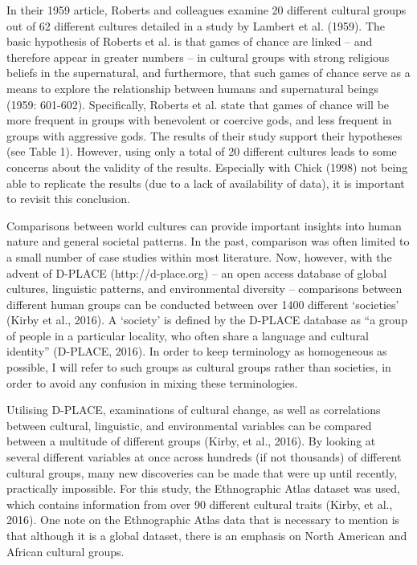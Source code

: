 \documentclass[%
	]{ijsra}
\begin{document}
In their 1959 article, Roberts and colleagues examine 20 different cultural groups out of 62 different cultures detailed in a study by Lambert et al. (1959). The basic hypothesis of Roberts et al. is that games of chance are linked – and therefore appear in greater numbers – in cultural groups with strong religious beliefs in the supernatural, and furthermore, that such games of chance serve as a means to explore the relationship between humans and supernatural beings (1959: 601-602). Specifically, Roberts et al. state that games of chance will be more frequent in groups with benevolent or coercive gods, and less frequent in groups with aggressive gods. The results of their study support their hypotheses (see Table 1). However, using only a total of 20 different cultures%
 leads to some concerns about the validity of the results. Especially with Chick (1998) not being able to replicate the results (due to a lack of availability of data), it is important to revisit this conclusion.
 
 
 
 Comparisons between world cultures can provide important insights into human nature and general societal patterns. In the past, comparison was often limited to a small number of case studies within most literature. Now, however, with the advent of D-PLACE (http://d-place.org) %
 – an open access database of global cultures, linguistic patterns, and environmental diversity – comparisons between different human groups can be conducted between over 1400 different ‘societies’ (Kirby et al., 2016). A ‘society’ is defined by the D-PLACE database as “a group of people in a particular locality, who often share a language and cultural identity” (D-PLACE, 2016). In order to keep terminology as homogeneous as possible, I will refer to such groups as cultural groups rather than societies, in order to avoid any confusion in mixing these terminologies.
 
 Utilising D-PLACE, examinations of cultural change, as well as correlations between cultural, linguistic, and environmental variables can be compared between a multitude of different groups (Kirby, et al., 2016). By looking at several different variables at once across hundreds (if not thousands) of different cultural groups, many new discoveries can be made that were up until recently, practically impossible. For this study, the Ethnographic Atlas dataset was used, which contains information from over 90 different cultural traits (Kirby, et al., 2016). One note on the Ethnographic Atlas data that is necessary to mention is that although it is a global dataset, there is an emphasis on North American and African cultural groups.
 
\end{document}
